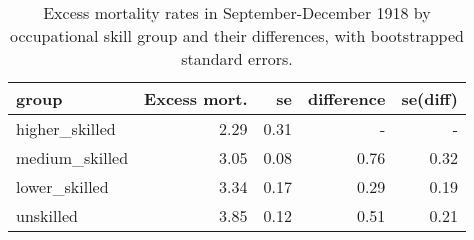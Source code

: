 \begin{table}

\caption{\label{tab:lab:emr_byskill_boot}Excess mortality rates in September-December 1918 by occupational skill group and their differences, with bootstrapped standard errors.}
\centering
\begin{tabular}[t]{l|r|r|r|r}
\hline
group & Excess mort. & se & difference & se(diff)\\
\hline
higher\_skilled & 2.29 & 0.31 & - & -\\
\hline
medium\_skilled & 3.05 & 0.08 & 0.76 & 0.32\\
\hline
lower\_skilled & 3.34 & 0.17 & 0.29 & 0.19\\
\hline
unskilled & 3.85 & 0.12 & 0.51 & 0.21\\
\hline
\end{tabular}
\end{table}
